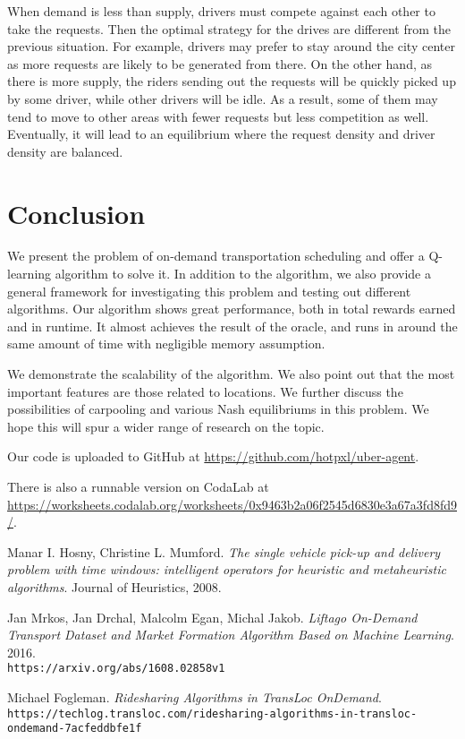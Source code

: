 \documentclass{article}
\begin{document}
When demand is less than supply, drivers must compete against each other to take the requests. Then the optimal strategy for the drives are different from the previous situation. For example, drivers may prefer to stay around the city center as more requests are likely to be generated from there. On the other hand, as there is more supply, the riders sending out the requests will be quickly picked up by some driver, while other drivers will be idle. As a result, some of them may tend to move to other areas with fewer requests but less competition as well. Eventually, it will lead to an equilibrium where the request density and driver density are balanced.

\section{Conclusion}

We present the problem of on-demand transportation scheduling and offer a Q-learning algorithm to solve it. In addition to the algorithm, we also provide a general framework for investigating this problem and testing out different algorithms. Our algorithm shows great performance, both in total rewards earned and in runtime. It almost achieves the result of the oracle, and runs in around the same amount of time with negligible memory assumption.

We demonstrate the scalability of the algorithm. We also point out that the most important features are those related to locations. We further discuss the possibilities of carpooling and various Nash equilibriums in this problem. We hope this will spur a wider range of research on the topic.

Our code is uploaded to GitHub at \url{https://github.com/hotpxl/uber-agent}.

There is also a runnable version on CodaLab at \\\url{https://worksheets.codalab.org/worksheets/0x9463b2a06f2545d6830e3a67a3fd8fd9/}.

\pagebreak
{}
\listoffigures
\listoftables

\begin{thebibliography}{9}
Manar I. Hosny, Christine L. Mumford.
\textit{The single vehicle pick-up and delivery problem with time windows: intelligent operators for heuristic and metaheuristic algorithms}.
Journal of Heuristics, 2008.

Jan Mrkos, Jan Drchal, Malcolm Egan, Michal Jakob.
\textit{Liftago On-Demand Transport Dataset and Market Formation Algorithm Based on Machine Learning}.
2016.
\\\texttt{https://arxiv.org/abs/1608.02858v1}

Michael Fogleman.
\textit{Ridesharing Algorithms in TransLoc OnDemand}.
\\\texttt{https://techlog.transloc.com/ridesharing-algorithms-in-transloc-ondemand-7acfeddbfe1f}
\end{thebibliography}
\end{document}
